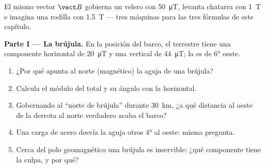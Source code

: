 \begin{problem}
\label{pb:g11:magnetic-fields:1}
El mismo vector $\vect B$ gobierna un velero con \qty{50}{\micro T},
levanta chatarra con \qty{1}{T} e imagina una rodilla con \qty{1.5}{T}
--- tres máquinas para las tres fórmulas de este capítulo.

\medskip
\noindent\textbf{Parte I --- La brújula.}
En la posición del barco, el  terrestre tiene una componente
horizontal de \qty{20}{\micro T} y una vertical de \qty{44}{\micro T};
la  es de $\ang{6}$ oeste.
\begin{enumerate}
  \item ¿Por qué apunta al norte (magnético) la aguja de una brújula?
  \item Calcula el módulo del  total y su ángulo con la horizontal.
  \item Gobernando al ``norte de brújula'' durante \qty{30}{km}, ¿a qué
        distancia al oeste de la derrota al norte verdadero acaba el
        barco?
  \item Una carga de acero desvía la aguja otros $\ang{4}$ al oeste:
        misma pregunta.
  \item Cerca del polo geomagnético una brújula es inservible: ¿qué
        componente tiene la culpa, y por qué?
\end{enumerate}


\end{problem}
